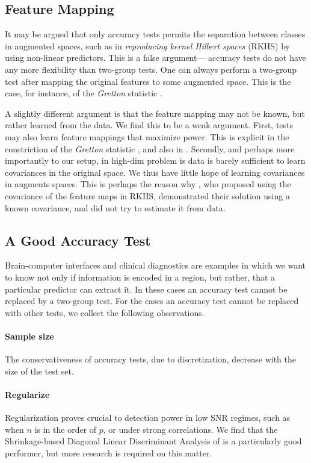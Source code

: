 \documentclass[onecolumn,draftclsnofoot]{IEEEtran}
\begin{document}
\subsection{Feature Mapping}
It may be argued that only accuracy tests permits the separation between classes in augmented spaces, such as in \emph{reproducing kernel Hilbert spaces} (RKHS) by using non-linear predictors. 
This is a false argument--- accuracy tests do not have any more flexibility than two-group tests. 
One can always perform a two-group test after mapping the original features to some augmented space. 
This is the case, for instance, of the \emph{Gretton} statistic \cite{gretton_kernel_2012-1}.

A slightly different argument is that the feature mapping may not be known, but rather learned from the data. 
We find this to be a weak argument.
First, tests may also learn feature mappings that maximize power. 
This is explicit in the constriction of the \emph{Gretton} statistic \cite{gretton_kernel_2012-1}, and also in \cite{vayatis_auc_2009}.
Secondly, and perhaps more importantly to our setup, in high-dim problem is data is barely sufficient to learn covariances in the original space. We thus have little hope of learning covariances in augments spaces. 
This is perhaps the reason why \cite{harchaoui2009kernel}, who proposed using the covariance of the feature maps in RKHS, demonstrated their solution using a known covariance, and did not try to estimate it from data. 


\subsection{A Good Accuracy Test}
Brain-computer interfaces and clinical diagnostics \cite{olivetti_induction_2012,wager_fmri-based_2013} are examples in which we want to know not only if information is encoded in a region, but rather, that a particular predictor can extract it. 
In these cases an accuracy test cannot be replaced by a two-group test. 
For the cases an accuracy test cannot be replaced with other tests, we collect the following observations.

\paragraph{Sample size} The conservativeness of accuracy tests, due to discretization, decrease with the size of the test set. 

\paragraph{Regularize}
Regularization proves crucial to detection power in low SNR regimes, such as when $n$ is in the order of $p$, or under strong correlations.
We find that the Shrinkage-based Diagonal Linear Discriminant Analysis of \cite{pang_shrinkage-based_2009} is a particularly good performer, but more research is required on this matter. 
\end{document}
